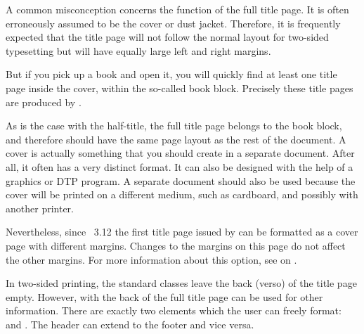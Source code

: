 \begin{Explain}
  A common misconception concerns the function of the full title page. It is
  often erroneously assumed to be the cover or dust jacket.
  Therefore, it is frequently expected that the title page will not follow the
  normal layout for two-sided typesetting but will have equally large left and
  right margins.

  But if you pick up a book and open it, you will quickly find at least one
  title page inside the cover, within the so-called book block. Precisely
  these title pages are produced by
  .

  As is the case with the half-title, the full title page belongs to the book
  block, and therefore should have the same page layout as the rest of the
  document. A cover is actually something that you should create in a
  separate document. After all, it often has a very distinct format. It can
  also be designed with the help of a graphics or DTP program. A separate
  document should also be used because the cover will be printed on a
  different medium, such as cardboard, and possibly with another printer.

  Nevertheless, since \KOMAScript~3.12 the first title page issued by
   can be formatted as a cover
  page with different margins. Changes to the margins on this page do not
  affect the other margins. For more information about this option, see
   on
  .
\end{Explain}
%
\EndIndexGroup


\begin{Declaration}
\end{Declaration}%
In two-sided printing, the
standard classes leave the back (verso) of the title page empty. However, with
{\KOMAScript} the back of the full title page can be used for other
information. There are exactly two elements which the user can freely format:
 and
. The header can extend to the footer and vice versa.
%
%
\EndIndexGroup


